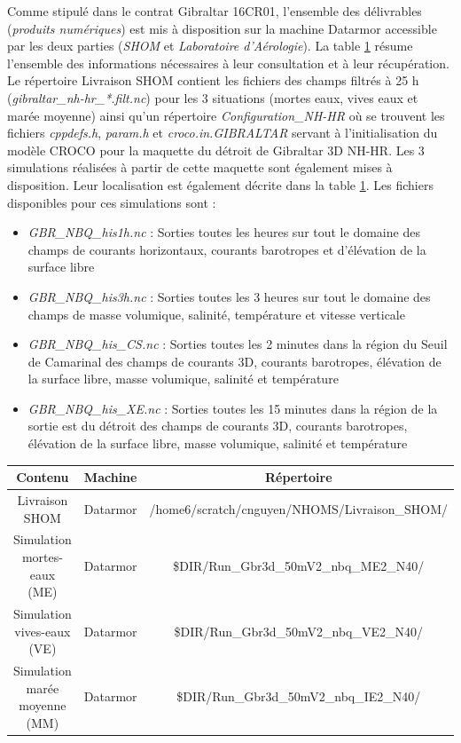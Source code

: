 \documentclass[a4paper,11pt]{report}
\begin{document}
Comme stipulé dans le contrat Gibraltar 16CR01, l'ensemble des délivrables (\textit{produits numériques}) est mis à disposition sur la machine Datarmor accessible par les deux parties (\textit{SHOM} et \textit{Laboratoire d'Aérologie}). La table \ref{delivrables} résume l'ensemble des informations nécessaires à leur consultation et à leur récupération. \\
Le répertoire Livraison SHOM contient les fichiers des champs filtrés à 25 h (\textit{gibraltar\_nh-hr\_*.filt.nc}) pour les 3 situations (mortes eaux, vives eaux et marée moyenne) ainsi qu'un répertoire \textit{ Configuration\_NH-HR} où se trouvent les fichiers  \textit{cppdefs.h},  \textit{param.h} et \textit{croco.in.GIBRALTAR} servant à l'initialisation du modèle CROCO pour la maquette du détroit de Gibraltar 3D NH-HR. Les 3 simulations réalisées à partir de cette maquette sont également mises à disposition. Leur localisation est également décrite dans la table \ref{delivrables}. Les fichiers disponibles pour ces simulations sont :
\begin{itemize}
\item \textit{GBR\_NBQ\_his1h.nc} : Sorties toutes les heures sur tout le domaine des champs de courants horizontaux, courants barotropes et d'élévation de la surface libre 
\item \textit{GBR\_NBQ\_his3h.nc} : Sorties toutes les 3 heures sur tout le domaine des champs de masse volumique, salinité, température et vitesse verticale 
\item \textit{GBR\_NBQ\_his\_CS.nc} : Sorties toutes les 2 minutes dans la région du Seuil de Camarinal des champs de courants 3D, courants barotropes, élévation de la surface libre, masse volumique, salinité et température
\item \textit{GBR\_NBQ\_his\_XE.nc} : Sorties toutes les 15 minutes dans la région de la sortie est du détroit des champs de courants 3D, courants barotropes, élévation de la surface libre, masse volumique, salinité et température
\end{itemize}

\begin{table}
	\centering
	\begin{tabular}{|c|c|c|}
		\hline
		Contenu & Machine & Répertoire\\
		\hline
		Livraison SHOM & Datarmor & /home6/scratch/cnguyen/NHOMS/Livraison\_SHOM/ \\
 		Simulation mortes-eaux (ME)  & Datarmor & \$DIR/Run\_Gbr3d\_50mV2\_nbq\_ME2\_N40/ \\
 		Simulation vives-eaux (VE)  & Datarmor & \$DIR/Run\_Gbr3d\_50mV2\_nbq\_VE2\_N40/ \\
 		Simulation marée moyenne (MM)  & Datarmor & \$DIR/Run\_Gbr3d\_50mV2\_nbq\_IE2\_N40/ \\
 		\hline
	\end{tabular}
	\label{delivrables}
\end{table}
\end{document}
